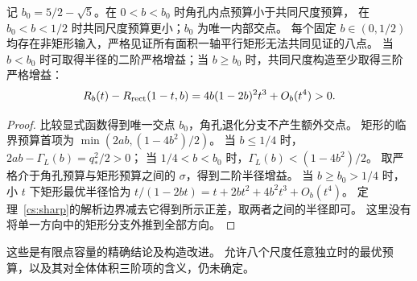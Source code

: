 \begin{corollary}[两种构造的方向过渡及非矩形增益]\label{cs:transition}
记 $b_0=5/2-\sqrt5$。在 $0<b<b_0$ 时角孔内点预算小于共同尺度预算，
在 $b_0<b<1/2$ 时共同尺度预算更小；$b_0$ 为唯一内部交点。
每个固定 $b\in(0,1/2)$ 均存在非矩形输入，严格见证所有面积一轴平行矩形无法共同见证的八点。
当 $b<b_0$ 时可取得半径的二阶严格增益；当 $b\ge b_0$ 时，共同尺度构造至少取得三阶严格增益：
\[
 R_b(t)-R_{\rm rect}(1-t,b)
 =4b(1-2b)^2t^3+O_b(t^4)>0.
\]
\end{corollary}
\begin{proof}
比较显式函数得到唯一交点 $b_0$，角孔退化分支不产生额外交点。
矩形的临界预算首项为 $\min(2ab,(1-4b^2)/2)$。
当 $b\le1/4$ 时，$2ab-\Gamma_L(b)=q_*^2/2>0$；
当 $1/4<b<b_0$ 时，$\Gamma_L(b)<(1-4b^2)/2$。
取严格介于角孔预算与矩形预算之间的 $\sigma$，得到二阶半径增益。
当 $b\ge b_0>1/4$ 时，小 $t$ 下矩形最优半径恰为
$t/(1-2bt)=t+2bt^2+4b^2t^3+O_b(t^4)$。
定理~\ref{cs:sharp}的解析边界减去它得到所示正差，取两者之间的半径即可。
这里没有将单一方向中的矩形分支外推到全部方向。
\end{proof}
这些是有限点容量的精确结论及构造改进。
允许八个尺度任意独立时的最优预算，以及其对全体体积三阶项的含义，仍未确定。

